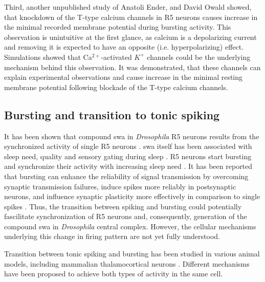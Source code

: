 \documentclass[../main.tex]{subfiles}
\begin{document}
Third, another unpublished study of Anatoli Ender, and David Owald showed, that knockdown of the T-type calcium channels in R5 neurons causes increase in the minimal recorded membrane potential during bursting activity. This observation is unintuitive at the first glance, as calcium is a depolarizing current and removing it is expected to have an opposite (i.e. hyperpolarizing) effect.
Simulations showed that Ca$^{2+}$-activated $K^+$ channels could be the underlying mechanism behind this observation. It was demonstrated, that these channels can explain experimental observations and cause increase in the minimal resting membrane potential following blockade of the T-type calcium channels.


\subsection{Bursting and transition to tonic spiking}

It has been shown that compound \gls{swa} in \textit{Drosophila} R5 neurons results from the synchronized activity of single R5 neurons \parencite{raccugliaNetworkSpecificSynchronizationElectrical2019}. \gls{swa} itself has been associated with sleep need, quality and sensory gating during sleep \parencite{suarez-grimaltNeuralArchitectureSleep2021,raccugliaNetworkSpecificSynchronizationElectrical2019,gentThalamicDualControl2018}. R5 neurons start bursting and synchronize their activity with increasing sleep need \parencite{suarez-grimaltNeuralArchitectureSleep2021}. 
It has been reported that bursting can enhance the reliability of signal transmission by overcoming synaptic transmission failures, induce spikes more reliably in postsynaptic neurons, and influence synaptic plasticity more effectively in comparison to single spikes \parencite{lismanBurstsUnitNeural1997,kimBurstSynchronizationScalefree2019}.
Thus, the transition between spiking and bursting could potentially fascilitate synchronization of R5 neurons and, consequently, generation of the compound \gls{swa} in \textit{Drosophila} central complex. However, the cellular mechanisms underlying this change in firing pattern are not yet fully understood.

Transition between tonic spiking and bursting has been studied in various animal models, including mammalian thalamocortical neurons \parencite{wangMultipleDynamicalModes1994,suzukiTtypeCalciumChannels1989,vickstromTTypeCalciumChannels2020,liuMultipleConductancesCooperatively2008,mccormickModelElectrophysiologicalProperties1992}. Different mechanisms have been proposed to achieve both types of activity in the same cell.
\end{document}
